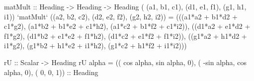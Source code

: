 \documentclass[]{article}
\newenvironment{Shaded}{}{}
\newcommand{\DataTypeTok}[1]{\textcolor[rgb]{0.56,0.13,0.00}{{#1}}}
\newcommand{\DecValTok}[1]{\textcolor[rgb]{0.25,0.63,0.44}{{#1}}}
\newcommand{\OtherTok}[1]{\textcolor[rgb]{0.00,0.44,0.13}{{#1}}}
\newcommand{\FunctionTok}[1]{\textcolor[rgb]{0.02,0.16,0.49}{{#1}}}
\newcommand{\NormalTok}[1]{{#1}}
\begin{document}
\begin{Shaded}
\begin{Highlighting}[]
\OtherTok{matMult ::} \DataTypeTok{Heading} \OtherTok{->} \DataTypeTok{Heading} \OtherTok{->} \DataTypeTok{Heading}
\NormalTok{( (a1, b1, c1), (d1, e1, f1), (g1, h1, i1)) }\OtherTok{`matMult`}
 \NormalTok{((a2, b2, c2), (d2, e2, f2), (g2, h2, i2)) }\FunctionTok{=}
    \NormalTok{(((a1}\FunctionTok{*}\NormalTok{a2 }\FunctionTok{+} \NormalTok{b1}\FunctionTok{*}\NormalTok{d2 }\FunctionTok{+} \NormalTok{c1}\FunctionTok{*}\NormalTok{g2), (a1}\FunctionTok{*}\NormalTok{b2 }\FunctionTok{+} \NormalTok{b1}\FunctionTok{*}\NormalTok{e2 }\FunctionTok{+} \NormalTok{c1}\FunctionTok{*}\NormalTok{h2), (a1}\FunctionTok{*}\NormalTok{c2 }\FunctionTok{+} \NormalTok{b1}\FunctionTok{*}\NormalTok{f2 }\FunctionTok{+} \NormalTok{c1}\FunctionTok{*}\NormalTok{i2)),}
     \NormalTok{((d1}\FunctionTok{*}\NormalTok{a2 }\FunctionTok{+} \NormalTok{e1}\FunctionTok{*}\NormalTok{d2 }\FunctionTok{+} \NormalTok{f1}\FunctionTok{*}\NormalTok{g2), (d1}\FunctionTok{*}\NormalTok{b2 }\FunctionTok{+} \NormalTok{e1}\FunctionTok{*}\NormalTok{e2 }\FunctionTok{+} \NormalTok{f1}\FunctionTok{*}\NormalTok{h2), (d1}\FunctionTok{*}\NormalTok{c2 }\FunctionTok{+} \NormalTok{e1}\FunctionTok{*}\NormalTok{f2 }\FunctionTok{+} \NormalTok{f1}\FunctionTok{*}\NormalTok{i2)),}
     \NormalTok{((g1}\FunctionTok{*}\NormalTok{a2 }\FunctionTok{+} \NormalTok{h1}\FunctionTok{*}\NormalTok{d2 }\FunctionTok{+} \NormalTok{i1}\FunctionTok{*}\NormalTok{g2), (g1}\FunctionTok{*}\NormalTok{b2 }\FunctionTok{+} \NormalTok{h1}\FunctionTok{*}\NormalTok{e2 }\FunctionTok{+} \NormalTok{i1}\FunctionTok{*}\NormalTok{h2), (g1}\FunctionTok{*}\NormalTok{c2 }\FunctionTok{+} \NormalTok{h1}\FunctionTok{*}\NormalTok{f2 }\FunctionTok{+} \NormalTok{i1}\FunctionTok{*}\NormalTok{i2)))}
\end{Highlighting}
\end{Shaded}
\begin{Shaded}
\begin{Highlighting}[]
\OtherTok{rU       ::} \DataTypeTok{Scalar} \OtherTok{->} \DataTypeTok{Heading}
\NormalTok{rU alpha  }\FunctionTok{=} \NormalTok{((  }\FunctionTok{cos} \NormalTok{alpha, }\FunctionTok{sin} \NormalTok{alpha, }\DecValTok{0}\NormalTok{),}
             \NormalTok{( }\FunctionTok{-sin} \NormalTok{alpha, }\FunctionTok{cos} \NormalTok{alpha, }\DecValTok{0}\NormalTok{),}
             \NormalTok{(          }\DecValTok{0}\NormalTok{,         }\DecValTok{0}\NormalTok{, }\DecValTok{1}\NormalTok{))}\OtherTok{ ::} \DataTypeTok{Heading}
\end{Highlighting}
\end{Shaded}
\end{document}

